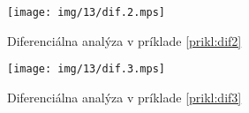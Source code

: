 \begin{priklad}
    \label{prikl:dif2}
    \begin{figure}[H]
        \centering
        \texttt{[image: img/13/dif.2.mps]}
        \caption{Diferenciálna analýza v príklade \ref{prikl:dif2}}
    \end{figure}
    
    
\end{priklad}

\begin{priklad}
    \label{prikl:dif3}
    \begin{figure}[H]
        \centering
        \texttt{[image: img/13/dif.3.mps]}
        \caption{Diferenciálna analýza v príklade \ref{prikl:dif3}}
    \end{figure}
    
    
\end{priklad}
